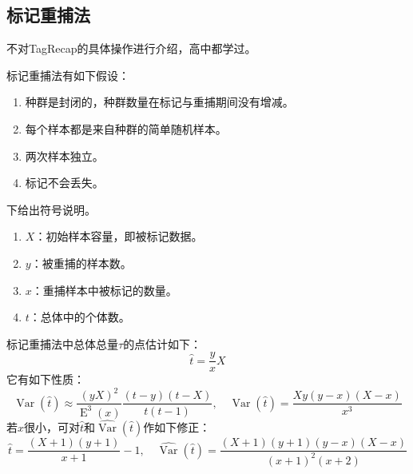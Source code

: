\subsection{标记重捕法}
不对\gls{TagRecap}的具体操作进行介绍，高中都学过。\par
\begin{note}
	标记重捕法有如下假设：
	\begin{enumerate}
		\item 种群是封闭的，种群数量在标记与重捕期间没有增减。 
		\item 每个样本都是来自种群的简单随机样本。
		\item 两次样本独立。
		\item 标记不会丢失。
	\end{enumerate}
\end{note}
下给出符号说明。
\begin{enumerate}
	\item $X$：初始样本容量，即被标记数据。
	\item $y$：被重捕的样本数。
	\item $x$：重捕样本中被标记的数量。
	\item $t$：总体中的个体数。
\end{enumerate}
\begin{theorem}
	标记重捕法中总体总量$\tau$的点估计如下：
	\begin{equation*}
		\hat{t}=\frac{y}{x}X 
	\end{equation*}
	它有如下性质：
	\begin{equation*}
		\operatorname{Var}(\hat{t})\approx\frac{(yX)^2}{\operatorname{E}^3(x)}\frac{(t-y)(t-X)}{t(t-1)},\quad
		\widehat{\operatorname{Var}}(\hat{t})=\frac{Xy(y-x)(X-x)}{x^3}
	\end{equation*}
	若$x$很小，可对$\hat{t}$和$\hat{\operatorname{Var}}(\hat{t})$作如下修正：
	\begin{equation*}
		\hat{t}=\frac{(X+1)(y+1)}{x+1}-1,\quad
		\widehat{\operatorname{Var}}(\hat{t})=\frac{(X+1)(y+1)(y-x)(X-x)}{(x+1)^2(x+2)}
	\end{equation*}
\end{theorem}
